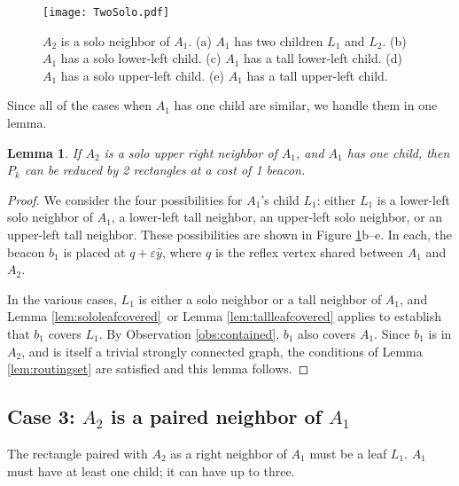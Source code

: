 \documentclass{article}
\newtheorem{lemma}{Lemma}
\begin{document}
		\begin{figure}[htbp] 
			\begin{center}
				\texttt{[image: TwoSolo.pdf]} 
			\end{center}
			\caption{ 
				$A_2$ is a solo neighbor of $A_1$.
				(a) $A_1$ has two children $L_1$ and $L_2$.
				(b) $A_1$ has a solo lower-left child. 
				(c) $A_1$ has a tall lower-left child.
				(d) $A_1$ has a solo upper-left child. 
				(e) $A_1$ has a tall upper-left child.
			}
			\label{fig:twosolo}
		\end{figure}

		Since all of the cases when $A_1$ has one child are similar, we handle them in
		one lemma.
		
		\begin{lemma}\label{lem:twosoloone}
			If $A_2$ is a solo upper right neighbor of $A_1$, and $A_1$ has one child,
			then $P_k$ can be reduced by 2 rectangles at a cost of 1 beacon.
		\end{lemma}
		\begin{proof}
			We consider the four possibilities for $A_1$'s child $L_1$:
			either $L_1$ is a lower-left solo neighbor of $A_1$,
			a lower-left tall neighbor,
			an upper-left solo neighbor,
			or an upper-left tall neighbor.
			These possibilities are shown in Figure \ref{fig:twosolo}b--e.
			In each, the beacon $b_1$ is placed at $q + \varepsilon\hat{y}$, where
			$q$ is the reflex vertex shared
			between $A_1$ and $A_2$.
			
			In the various cases, $L_1$ is either a solo neighbor or a tall neighbor of
			$A_1$, and Lemma \ref{lem:sololeafcovered}\ or Lemma
			\ref{lem:tallleafcovered} applies to establish that $b_1$ covers $L_1$.
			By Observation \ref{obs:contained}, $b_1$ also covers $A_1$.
			Since $b_1$ is in $A_2$, and is itself a trivial
			strongly connected graph, the conditions of Lemma \ref{lem:routingset} are
			satisfied and this lemma follows.
		\end{proof} 

	\subsection{Case 3: $A_2$ is a paired neighbor of $A_1$}
			\label{sec:atwopaired} 
		The rectangle paired with $A_2$ as a right neighbor of $A_1$ must be a leaf
		$L_1$.
		$A_1$ must have at least one child; it can have up to three.
		
\end{document}
